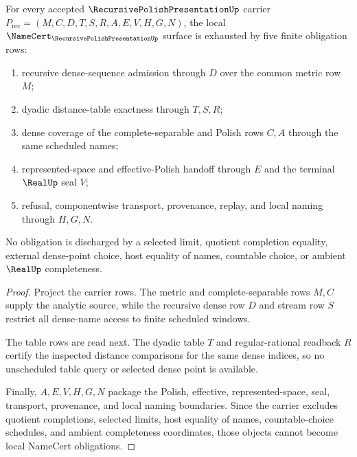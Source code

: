 \begin{theorem}
\label{thm:recursive-polish-presentation-namecert-obligations}
For every accepted $\RecursivePolishPresentationUp$ carrier $P_{\mathrm{rec}}=(M,C,D,T,S,R,A,E,V,H,G,N)$, the local $\NameCert_{\RecursivePolishPresentationUp}$ surface is exhausted by five finite obligation rows:
\begin{enumerate}
  \item recursive dense-sequence admission through $D$ over the common metric row $M$;
  \item dyadic distance-table exactness through $T,S,R$;
  \item dense coverage of the complete-separable and Polish rows $C,A$ through the same scheduled names;
  \item represented-space and effective-Polish handoff through $E$ and the terminal $\RealUp$ seal $V$;
  \item refusal, componentwise transport, provenance, replay, and local naming through $H,G,N$.
\end{enumerate}
No obligation is discharged by a selected limit, quotient completion equality, external dense-point choice, host equality of names, countable choice, or ambient $\RealUp$ completeness.
\end{theorem}
\begin{proof}
Project the carrier rows. The metric and complete-separable rows $M,C$ supply the analytic source, while the recursive dense row $D$ and stream row $S$ restrict all dense-name access to finite scheduled windows.

The table rows are read next. The dyadic table $T$ and regular-rational readback $R$ certify the inspected distance comparisons for the same dense indices, so no unscheduled table query or selected dense point is available.

Finally, $A,E,V,H,G,N$ package the Polish, effective, represented-space, seal, transport, provenance, and local naming boundaries. Since the carrier excludes quotient completions, selected limits, host equality of names, countable-choice schedules, and ambient completeness coordinates, those objects cannot become local NameCert obligations.
\end{proof}

